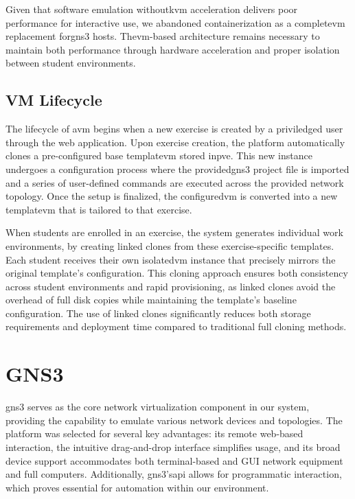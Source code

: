             Given that software emulation without\ac{kvm} acceleration delivers poor performance for interactive use, we abandoned containerization 
            as a complete\ac{vm} replacement for\ac{gns3} hosts. The\ac{vm}-based architecture remains necessary to maintain both performance through hardware 
            acceleration and proper isolation between student environments.

    \subsection{VM Lifecycle}

        The lifecycle of a\ac{vm} begins when a new exercise is created by a priviledged user through the web application. 
        Upon exercise creation, the platform automatically clones a pre-configured base template\ac{vm} stored in\ac{pve}. This new instance 
        undergoes a configuration process where the provided\ac{gns3} project file is imported and a series of user-defined commands are executed 
        across the provided network topology. Once the setup is finalized, the configured\ac{vm} is converted into a new template\ac{vm} that 
        is tailored to that exercise.

        When students are enrolled in an exercise, the system generates individual work environments, by creating linked clones from these 
        exercise-specific templates. Each student receives their own isolated\ac{vm} instance that precisely mirrors the original template's 
        configuration. This cloning approach ensures both consistency across student environments and rapid provisioning, as linked clones 
        avoid the overhead of full disk copies while maintaining the template's baseline configuration. The use of linked clones significantly 
        reduces both storage requirements and deployment time compared to traditional full cloning methods.
        
\section{GNS3}

    \ac{gns3} serves as the core network virtualization component in our system, providing the capability to emulate various network devices 
    and topologies. The platform was selected for several key advantages: its remote web-based interaction, the intuitive drag-and-drop interface 
    simplifies usage, and its broad device support accommodates both terminal-based and GUI network equipment and full computers. Additionally, 
    \ac{gns3}'s\ac{api} allows for programmatic interaction, which proves essential for automation within our environment.

